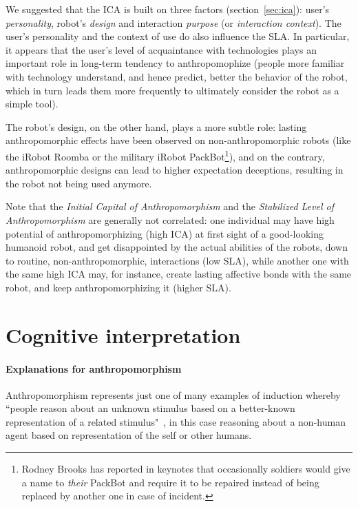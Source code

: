 \documentclass{sig-alternate-2013}
\begin{document}
We suggested that the ICA is built on three factors (section~\ref{sec:ica}):
user's \emph{personality}, robot's \emph{design} and interaction \emph{purpose}
(or \emph{interaction context}). The user's personality and the context of use
do also influence the SLA. In particular, it appears that the user's level of
acquaintance with technologies plays an important role in long-term tendency to
anthropomophize (people more familiar with technology understand, and hence
predict, better the behavior of the robot, which in turn leads them more
frequently to ultimately consider the robot as a simple tool).

The robot's design, on the other hand, plays a more subtle role: lasting
anthropomorphic effects have been observed on non-anthropomorphic robots (like
the iRobot Roomba or the military iRobot PackBot\footnote{Rodney Brooks has
reported in keynotes that occasionally soldiers would give a name to
\emph{their} PackBot and require it to be repaired instead of being replaced by
another one in case of incident.}), and on the contrary, anthropomorphic
designs can lead to higher expectation deceptions, resulting in the robot not
being used anymore.

Note that the \emph{Initial Capital of Anthropomorphism} and the
\emph{Stabilized Level of Anthropomorphism} are generally not correlated: one
individual may have high potential of anthropomorphizing (high ICA) at first
sight of a good-looking humanoid robot, and get disappointed by the actual
abilities of the robots, down to routine, non-anthropomorphic, interactions
(low SLA), while another one with the same high ICA may, for instance, create
lasting affective bonds with the same robot, and keep anthropomorphizing it
(higher SLA).

\section{Cognitive interpretation}
\label{sec:cognitivemodel}

\paragraph*{Explanations for anthropomorphism}

Anthropomorphism represents just one of many examples of induction whereby
``people reason about an unknown stimulus based on a better-known representation
of a related stimulus"~\cite{epley_when_2008}, in this case reasoning about a
non-human agent based on representation of the self or other humans.
\end{document}
